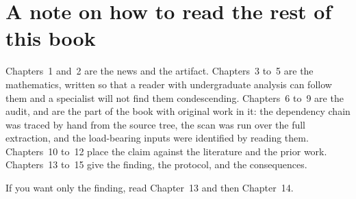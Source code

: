\section*{A note on how to read the rest of this book}Chapters~1 and~2 are the news and the artifact. Chapters~3 to~5 are the
mathematics, written so that a reader with undergraduate analysis can follow
them and a specialist will not find them condescending. Chapters~6 to~9 are the
audit, and are the part of the book with original work in it: the dependency
chain was traced by hand from the source tree, the scan was run over the full
extraction, and the load-bearing inputs were identified by reading them.
Chapters~10 to~12 place the claim against the literature and the prior work.
Chapters~13 to~15 give the finding, the protocol, and the consequences.

If you want only the finding, read Chapter~13 and then Chapter~14.
